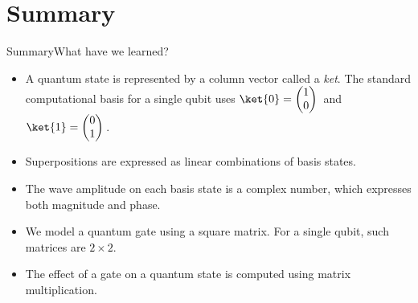 \section{Summary}
\begin{frame}{Summary}{What have we learned?}
\begin{itemize}
    \item A quantum state is represented by a column vector called a \emph{ket}.  The standard computational basis for a single qubit uses $\ket{0}=\PZero{}$ and $\ket{1}=\POne{}$.
    \item Superpositions are expressed as linear combinations of basis states.  
    \item The wave amplitude on each basis state is a complex number, which expresses both magnitude and phase.
    \item We model a quantum gate using a square matrix.  For a single qubit, such matrices are $2\times 2$.
    \item The effect of a gate on a quantum state is computed using matrix multiplication.
\end{itemize}
    
\end{frame}
